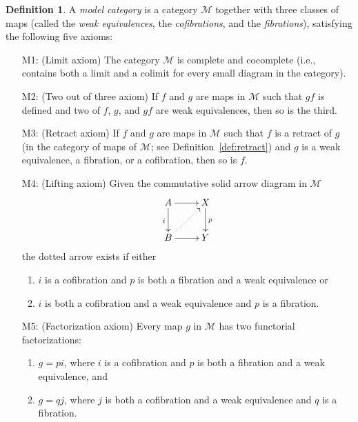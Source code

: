 \documentclass[12pt]{amsart}
\numberwithin{equation}{section}
\theoremstyle{slplain}
\theoremstyle{definition}
\newtheorem{defn}[equation]{Definition} %
\theoremstyle{remark}
\newcommand{\defref}{Definition~\ref}
\newcommand{\cat}[1]{\mathcal{#1}}
\begin{document}
\begin{defn}
  \label{def:ModCat}
  A \emph{model category} is a category $\cat M$ together with three
  classes of maps (called the \emph{weak equivalences}, the
  \emph{cofibrations}, and the \emph{fibrations}), satisfying the
  following five axioms:
  \begin{itemize}
  \item[M1:] (Limit axiom) The category $\cat M$ is complete and
    cocomplete (i.e., contains both a limit and a colimit for every
    small diagram in the category).
  \item[M2:] (Two out of three axiom) If $f$ and $g$ are maps in $\cat
    M$ such that $gf$ is defined and two of $f$, $g$, and $gf$ are
    weak equivalences, then so is the third.
  \item[M3:] (Retract axiom) If $f$ and $g$ are maps in $\cat M$ such
    that $f$ is a retract of $g$ (in the category of maps of $\cat M$;
    see \defref{def:retract}) and $g$ is a weak equivalence, a
    fibration, or a cofibration, then so is $f$.
  \item[M4:] (Lifting axiom) Given the commutative solid arrow diagram
    in $\cat M$
    \begin{displaymath}
      \xymatrix{
        {A} \ar[r] \ar[d]_{i} 
          & {X} \ar[d]^{p}\\
        {B} \ar@{.>}[ur] \ar[r]  
          & {Y}
      }
    \end{displaymath}
    the dotted arrow exists if either
    \begin{enumerate}
    \item $i$ is a cofibration and $p$ is both a fibration and a weak
      equivalence or
    \item $i$ is both a cofibration and a weak equivalence and $p$ is
      a fibration.
    \end{enumerate}
  \item[M5:] (Factorization axiom) Every map $g$ in $\cat M$ has two
    functorial factorizations:
    \begin{enumerate}
    \item $g = pi$, where $i$ is a cofibration and $p$ is both a
      fibration and a weak equivalence, and
    \item $g = qj$, where $j$ is both a cofibration and a weak
      equivalence and $q$ is a fibration.
    \end{enumerate}
  \end{itemize}
\end{defn}
\end{document}
